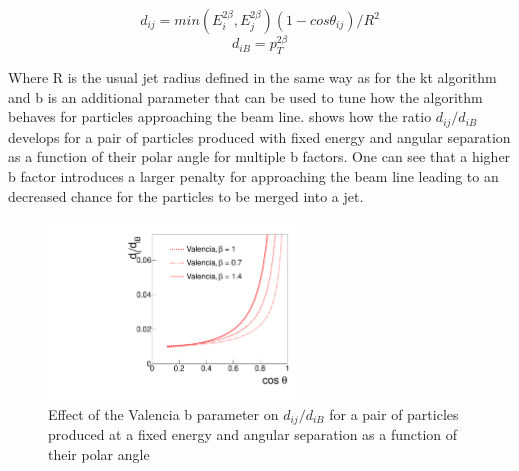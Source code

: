 \begin{equation}
d_{ij}=min(E_i^{2\beta},E_j^{2\beta})(1-cos\theta_{ij})/R^2
\end{equation}
\begin{equation}
d_{iB}=p_T^{2\beta}
\end{equation}

Where R is the usual jet radius defined in the same way as for the kt algorithm and b is an additional parameter that can be used to tune how the algorithm behaves for particles approaching the beam line.  shows how the ratio $d_{ij}/d_{iB}$ develops for a pair of particles produced with fixed energy and angular separation as a function of their polar angle for multiple b factors. One can see that a higher b factor introduces a larger penalty for approaching the beam line leading to an decreased chance for the particles to be merged into a jet.

\begin{figure}
  \centering
  \includegraphics[width=0.6\textwidth]{TopAnalysis/figures/distance_ratio_vlc.pdf}
  \caption[Effect of the Valencia b parameter]{Effect of the Valencia b parameter on $d_{ij}/d_{iB}$ for a pair of particles produced at a fixed energy and angular separation as a function of their polar angle\cite{Boronat:2014hva}}
  \label{fig:valenciaPerformance}
\end{figure}

